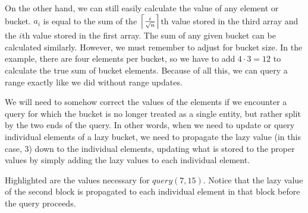 On the other hand,
we can still easily calculate the value of any element or bucket. $a_i$ is equal to the sum of the $\left\lceil \frac{i}{\sqrt{n}} \right\rceil$th value stored in the third array 
and the $i$th value stored in the first array. The sum of any given bucket can be calculated similarly. However, we must remember to adjust for bucket size. In the example, 
there are four elements per bucket, so we have to add $4 \cdot 3 = 12$ to calculate the true sum of bucket elements. 
Because of all this, we can query a range exactly like we did without range updates.

We will need to somehow correct the values of the elements if we encounter a query for which the bucket is no longer treated as a single entity, but rather split by the two ends
of the query. In other words, when we need to update or query individual elements of a lazy bucket, we need to propagate the lazy value (in this case, 3) down to the individual
elements, updating what is stored to the proper values by simply adding the lazy values to each individual element.

Highlighted are the values necessary for $query(7,15)$. Notice that the lazy value of the second block is propagated to each individual element in that block before the
query proceeds.

